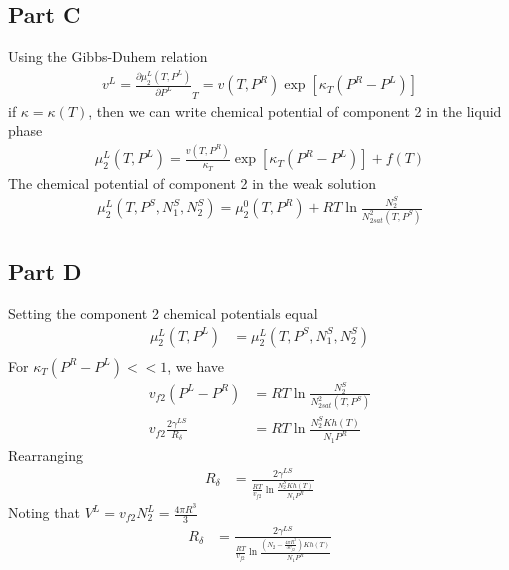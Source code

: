 \documentclass{article}
\begin{document}
\subsection*{Part C}
Using the Gibbs-Duhem relation
\begin{align*}
v^L=\frac{\partial \mu_2^L(T,P^L)}{\partial P^L}_T=v(T,P^R)\exp[\kappa_T(P^R-P^L)]
\end{align*}
if $\kappa=\kappa(T)$, then we can write chemical potential of component 2 in the liquid phase
\begin{align*}
\mu_2^L(T,P^L)=\frac{v(T,P^R)}{\kappa_T}\exp[\kappa_T(P^R-P^L)]+f(T)
\end{align*}
The chemical potential of component 2 in the weak solution
\begin{align*}
\mu_2^L(T,P^S,N_1^S,N_2^S)=\mu_2^0(T,P^R)+RT\ln\frac{N_2^S}{N^2_{2sat}(T,P^S)}
\end{align*}

\subsection*{Part D}
Setting the component 2 chemical potentials equal
\begin{align*}
\mu_2^L(T,P^L)&=\mu_2^L(T,P^S,N_1^S,N_2^S)\\
\end{align*}
For $\kappa_T(P^R-P^L)<<1$, we have
\begin{align*}
v_{f2}(P^L-P^R)&=RT\ln\frac{N_2^S}{N^2_{2sat}(T,P^S)}\\
v_{f2}\frac{2\gamma^{LS}}{R_\delta}&=RT\ln\frac{N_2^SKh(T)}{N_1P^R}
\end{align*}
Rearranging
\begin{align*}
{R_\delta}&=\frac{2\gamma^{LS}}{\frac{RT}{v_{f2}}\ln\frac{N_2^SKh(T)}{N_1P^R}}
\end{align*}
Noting that $V^L=v_{f2}N^L_2=\frac{4\pi R^3}{3}$
\begin{align*}
{R_\delta}&=\frac{2\gamma^{LS}}{\frac{RT}{v_{f2}}\ln\frac{(N_2-\frac{4\pi R^3}{3v_{f2}})Kh(T)}{N_1P^R}}
\end{align*}
\end{document}
